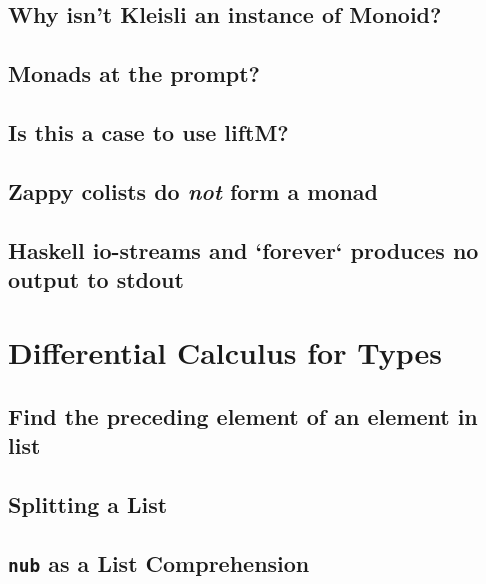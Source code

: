 \documentclass{book}%
\begin{document}
\section{Why isn't Kleisli an instance of Monoid?}


\section{Monads at the prompt?}


\section{Is this a case to use liftM?}


\section{Zappy colists do \emph{not} form a monad}


\section{Haskell io-streams and `forever` produces no output to stdout}



\chapter{Differential Calculus for Types}

\section{Find the preceding element of an element in list}


\section{Splitting a List}


\section{{\texttt{nub}} as a List Comprehension}

\end{document}
